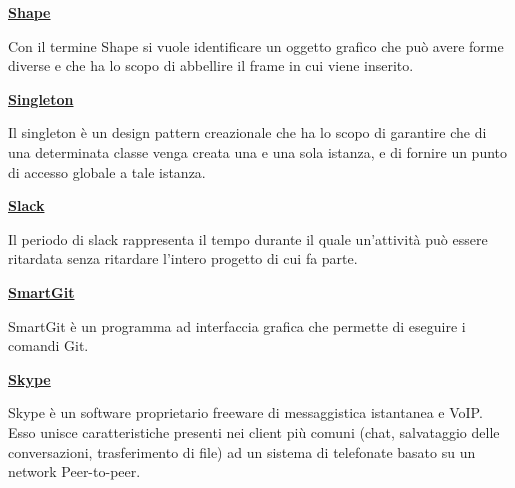 \bigskip
\begin{addmargin}[0em]{0em}
	\textbf{\underline{Shape}}
\end{addmargin} 
	
\medskip
\begin{addmargin}[5em]{1em}	
Con il termine Shape si vuole identificare un oggetto grafico che può avere forme diverse e che ha lo scopo di abbellire il frame in cui viene inserito.
\end{addmargin}	

\bigskip
\begin{addmargin}[0em]{0em}
	\textbf{\underline{Singleton}}
\end{addmargin} 
	
\medskip
\begin{addmargin}[5em]{1em}	
Il singleton è un design pattern creazionale che ha lo scopo di garantire che di una determinata classe venga creata una e una sola istanza, e di fornire un punto di accesso globale a tale istanza.
\end{addmargin}	

\bigskip
\begin{addmargin}[0em]{0em}
	\textbf{\underline{Slack}}
\end{addmargin} 
	
\medskip
\begin{addmargin}[5em]{1em}	
Il periodo di slack rappresenta il tempo durante il quale un'attività può essere ritardata senza ritardare l'intero progetto di cui fa parte.
\end{addmargin}	

\bigskip
\begin{addmargin}[0em]{0em}		
	\textbf{\underline{SmartGit}}
\end{addmargin} 
	
\medskip
\begin{addmargin}[5em]{1em}	
SmartGit è un programma ad interfaccia grafica che permette di eseguire i comandi Git.	
\end{addmargin}	

\bigskip
\begin{addmargin}[0em]{0em}		
	\textbf{\underline{Skype}}
\end{addmargin}
	 
\medskip
\begin{addmargin}[5em]{1em}	
Skype è un software proprietario freeware di messaggistica istantanea e VoIP. Esso unisce caratteristiche presenti nei client più comuni (chat, salvataggio delle conversazioni, trasferimento di file) ad un sistema di telefonate basato su un network Peer-to-peer.  
\end{addmargin}	

